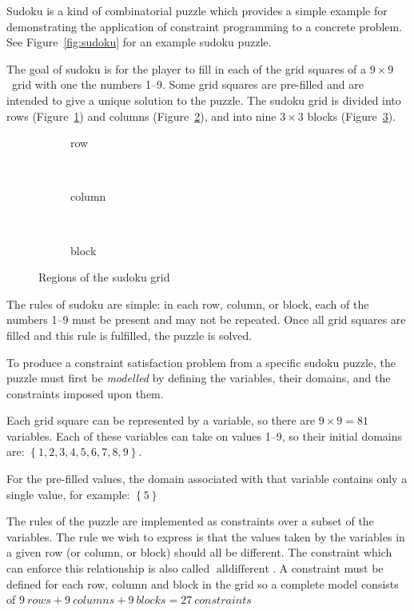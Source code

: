 \documentclass[a4paper,10pt,twoside,openright]{book}
\newcommand{\set}[1]{\left\{#1\right\}}
\DeclareMathOperator{\alldifferent}{alldifferent}
\begin{document}
Sudoku is a kind of combinatorial puzzle which provides a simple example for demonstrating the application of constraint programming to a concrete problem. See Figure~\ref{fig:sudoku} for an example sudoku puzzle. 

The goal of sudoku is for the player to fill in each of the grid squares of a $9\times9$~grid with one the numbers 1--9. Some grid squares are pre-filled and are intended to give a unique solution to the puzzle. The sudoku grid is divided into rows (Figure~\ref{fig:sudokurow}) and columns (Figure~\ref{fig:sudokucol}), and into nine $3 \times 3$ blocks (Figure~\ref{fig:sudokublock}). 
\begin{figure}[hbt]
    \centering
    \begin{subfigure}[b]{0.3\textwidth}
        \centering
        
        \caption{row}
        \label{fig:sudokurow}
    \end{subfigure}
    ~
    \begin{subfigure}[b]{0.3\textwidth}
        \centering
        
        \caption{column}
        \label{fig:sudokucol}
    \end{subfigure}
    ~
    \begin{subfigure}[b]{0.3\textwidth}
        \centering
        
        \caption{block}
        \label{fig:sudokublock}
    \end{subfigure}
    \caption{Regions of the sudoku grid}
    \label{fig:sudokuparts}
\end{figure}

The rules of sudoku are simple: in each row, column, or block, each of the numbers 1--9 must be present and may not be repeated. Once all grid squares are filled and this rule is fulfilled, the puzzle is solved.

To produce a constraint satisfaction problem from a specific sudoku puzzle, the puzzle must first be \textit{modelled} by defining the variables, their domains, and the constraints imposed upon them.

Each grid square can be represented by a variable, so there are $9 \times 9 = 81$ variables. Each of these variables can take on values 1--9, so their initial domains are: $\set{1,2,3,4,5,6,7,8,9}$.

For the pre-filled values, the domain associated with that variable contains only a single value, for example: $\set{5}$

The rules of the puzzle are implemented as constraints over a subset of the variables. The rule we wish to express is that the values taken by the variables in a given row (or column, or block) should all be different. The constraint which can enforce this relationship is also called $\alldifferent$. A constraint must be defined for each row, column and block in the grid so a complete model consists of $9~rows + 9~columns + 9~blocks = 27~constraints$
\end{document}
